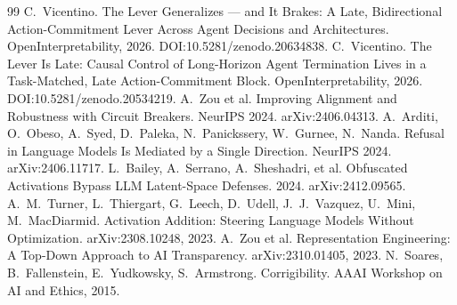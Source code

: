 \documentclass[11pt]{article}
\begin{document}
\begin{thebibliography}{99}
 C.~Vicentino. The Lever Generalizes --- and It Brakes: A Late, Bidirectional Action-Commitment Lever Across Agent Decisions and Architectures. OpenInterpretability, 2026. DOI:10.5281/zenodo.20634838.
 C.~Vicentino. The Lever Is Late: Causal Control of Long-Horizon Agent Termination Lives in a Task-Matched, Late Action-Commitment Block. OpenInterpretability, 2026. DOI:10.5281/zenodo.20534219.
 A.~Zou et al. Improving Alignment and Robustness with Circuit Breakers. NeurIPS 2024. arXiv:2406.04313.
 A.~Arditi, O.~Obeso, A.~Syed, D.~Paleka, N.~Panickssery, W.~Gurnee, N.~Nanda. Refusal in Language Models Is Mediated by a Single Direction. NeurIPS 2024. arXiv:2406.11717.
 L.~Bailey, A.~Serrano, A.~Sheshadri, et al. Obfuscated Activations Bypass LLM Latent-Space Defenses. 2024. arXiv:2412.09565.
 A.~M.~Turner, L.~Thiergart, G.~Leech, D.~Udell, J.~J.~Vazquez, U.~Mini, M.~MacDiarmid. Activation Addition: Steering Language Models Without Optimization. arXiv:2308.10248, 2023.
 A.~Zou et al. Representation Engineering: A Top-Down Approach to AI Transparency. arXiv:2310.01405, 2023.
 N.~Soares, B.~Fallenstein, E.~Yudkowsky, S.~Armstrong. Corrigibility. AAAI Workshop on AI and Ethics, 2015.
\end{thebibliography}
\end{document}
